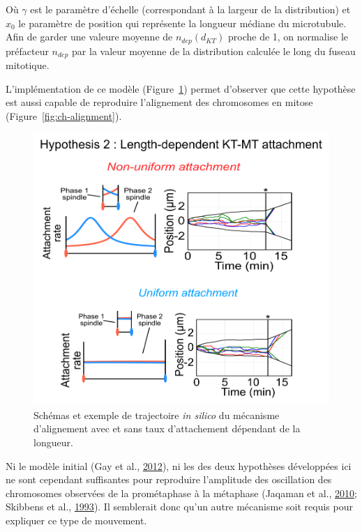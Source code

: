 \documentclass[12pt,a4paper,twoside,openright]{book}
\begin{document}
Où \(\gamma\) est le paramètre d'échelle (correspondant à la largeur de
la distribution) et \(x_0\) le paramètre de position qui représente la
longueur médiane du microtubule. Afin de garder une valeure moyenne de
\(n_{dep}(d_{KT})\) proche de 1, on normalise le préfacteur \(n_{dep}\)
par la valeur moyenne de la distribution calculée le long du fuseau
mitotique.

L'implémentation de ce modèle (Figure~\ref{fig:hyp2}) permet d'observer
que cette hypothèse est aussi capable de reproduire l'alignement des
chromosomes en mitose (Figure~\ref{fig:ch-alignment}).

\begin{figure}[htbp]
\centering
\includegraphics{figures/results/modelling/hyp2.png}
\caption[Second mécanisme expliquant l'alignement des chromosomes]{\label{fig:hyp2}Schémas
et exemple de trajectoire \emph{in silico} du mécanisme d'alignement
avec et sans taux d'attachement dépendant de la longueur.}
\end{figure}

Ni le modèle initial (Gay et al., \hyperref[ref-Gay2012a]{2012}), ni les
des deux hypothèses développées ici ne sont cependant suffisantes pour
reproduire l'amplitude des oscillation des chromosomes observées de la
prométaphase à la métaphase (Jaqaman et al.,
\hyperref[ref-Jaqaman2010]{2010}; Skibbens et al.,
\hyperref[ref-Skibbens1993]{1993}). Il semblerait donc qu'un autre
mécanisme soit requis pour expliquer ce type de mouvement.
\end{document}
